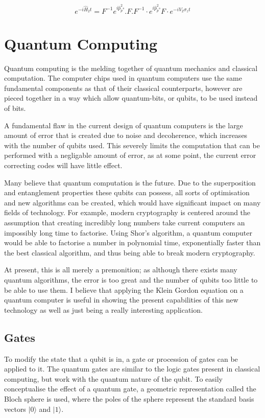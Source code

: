 \documentclass{article}
\begin{document}
\begin{equation}
e^{-i \hat{H}_{2} t}=F^{-1} e^{i \hat{p}_{p}^{2} \square} . F . F^{-1} \cdot e^{i \hat{p}_{p}^{2} \square} F \cdot e^{-i V_{2} \sigma_{z} t}
\end{equation}

\section{Quantum Computing}
Quantum computing is the melding together of quantum mechanics and classical computation. The computer chips used in quantum computers use the same fundamental components as that of their classical counterparts, however are pieced together in a way which allow quantum-bits, or qubits, to be used instead of bits. 

A fundamental flaw in the current design of quantum computers is the large amount of error that is created due to noise and decoherence, which increases with the number of qubits used. This severely limits the computation that can be performed with a negligable amount of error, as at some point, the current error correcting codes will have little effect. 

Many believe that quantum computation is the future. Due to the superposition and entanglement properties these qubits can possess, all sorts of optimisation and new algorithms can be created, which would have significant impact on many fields of technology. For example, modern cryptography is centered around the assumption that creating incredibly long numbers take current computers an impossibly long time to factorise. Using Shor's algorithm, a quantum computer would be able to factorise a number in polynomial time, exponentially faster than the best classical algorithm, and thus being able to break modern cryptography. \cite{minutephysics}

At present, this is all merely a premonition; as although there exists many quantum algorithms, the error is too great and the number of qubits too little to be able to use them. I believe that applying the Klein Gordon equation on a quantum computer is useful in showing the present capabilities of this new technology as well as just being a really interesting application.

\subsection{Gates}
To modify the state that a qubit is in, a gate or procession of gates can be applied to it. The quantum gates are similar to the logic gates present in classical computing, but work with the quantum nature of the qubit. To easily conceptualise the effect of a quantum gate, a geometric representation called the Bloch sphere is used, where the poles of the sphere represent the standard basis vectors $|0\rangle$ and $|1\rangle$.
\end{document}
